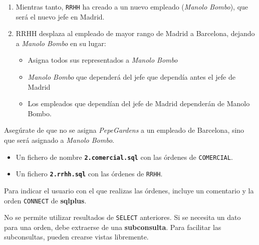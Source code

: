 \begin{homeworkProblem}

  {

    \begin{enumerate}
    \item Mientras tanto, \texttt{RRHH} ha creado a un nuevo empleado (\textit{Manolo Bombo}), que será el nuevo jefe en Madrid.
    \item RRHH desplaza al empleado de mayor rango de Madrid a Barcelona, dejando a \textit{Manolo Bombo} en su lugar:
      \begin{itemize}
      \item Asigna todos sus representados a \textit{Manolo Bombo}
      \item \textit{Manolo Bombo} que dependerá del jefe que dependía antes el jefe de Madrid
      \item Los empleados que dependían del jefe de Madrid dependerán de Manolo Bombo.
      \end{itemize}
    \end{enumerate}
    }
  Asegúrate de que no se asigna \textit{PepeGardens} a un empleado de Barcelona, sino que será asignado a \textit{Manolo Bombo}.

  \begin{Aviso}
    \begin{itemize}
    \item Un fichero de nombre \textbf{\texttt{2.comercial.sql}} con las órdenes de \texttt{COMERCIAL}.
    \item Un fichero \textbf{\texttt{2.rrhh.sql}} con las órdenes de \texttt{RRHH}.
    \end{itemize}

    Para indicar el usuario con el que realizas las órdenes, incluye un comentario y la orden  \texttt{CONNECT} de \textbf{sqlplus}.
    
    No se permite utilizar resultados de \texttt{SELECT} anteriores. Si se necesita un dato para una orden, debe extraerse de una \textbf{subconsulta}. Para facilitar las subconsultas, pueden crearse vistas libremente.
  \end{Aviso}

\end{homeworkProblem}


